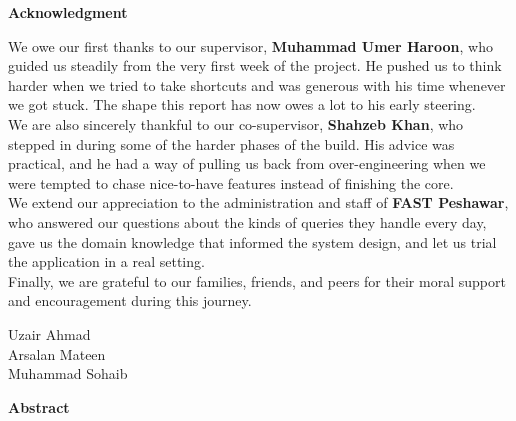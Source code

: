 \documentclass[12pt,a4paper]{report}
\begin{document}
\newpage
\thispagestyle{plain}
\begin{center}
  {\Large \textbf{Acknowledgment}}\\[1cm]
\end{center}

\noindent We owe our first thanks to our supervisor, \textbf{Muhammad Umer
Haroon}, who guided us steadily from the very first week of the project. He
pushed us to think harder when we tried to take shortcuts and was generous
with his time whenever we got stuck. The shape this report has now owes a lot
to his early steering.\\[0.5cm]

\noindent We are also sincerely thankful to our co-supervisor, \textbf{Shahzeb
Khan}, who stepped in during some of the harder phases of the build. His
advice was practical, and he had a way of pulling us back from
over-engineering when we were tempted to chase nice-to-have features instead
of finishing the core.\\[0.5cm]

\noindent We extend our appreciation to the administration and staff of
\textbf{FAST Peshawar}, who answered our questions about the kinds of queries
they handle every day, gave us the domain knowledge that informed the system
design, and let us trial the application in a real setting.\\[0.5cm]

\noindent Finally, we are grateful to our families, friends, and peers for
their moral support and encouragement during this journey.\\[1.2cm]

\begin{flushright}
  Uzair Ahmad\\
  Arsalan Mateen\\
  Muhammad Sohaib
\end{flushright}

\newpage
\thispagestyle{plain}
\begin{center}
  {\Large \textbf{Abstract}}\\[1cm]
\end{center}
\end{document}
